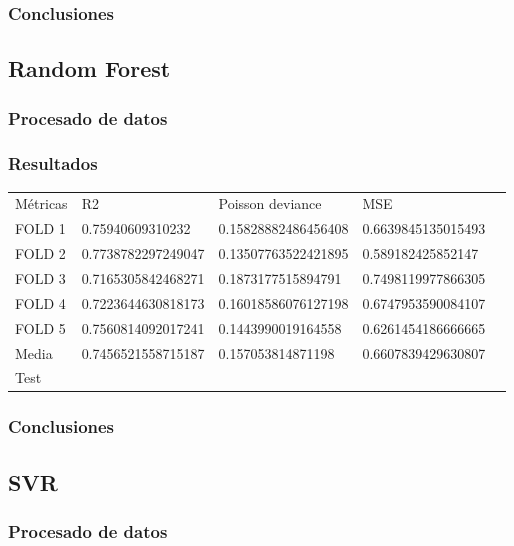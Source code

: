 \subsubsection{Conclusiones}

\subsection{Random Forest}
\subsubsection{Procesado de datos}
\subsubsection{Resultados}
\begin{table}[htbp]
    \begin{tabular}{|l|l|l|l|l}
    \cline{1-4}
    Métricas & R2                 & Poisson deviance    & MSE                \\ \cline{1-4}
    FOLD 1   & 0.75940609310232   & 0.15828882486456408 & 0.6639845135015493 \\ \cline{1-4}
    FOLD 2   & 0.7738782297249047 & 0.13507763522421895 & 0.589182425852147  \\ \cline{1-4}
    FOLD 3   & 0.7165305842468271 & 0.1873177515894791  & 0.7498119977866305 \\ \cline{1-4}
    FOLD 4   & 0.7223644630818173 & 0.16018586076127198 & 0.6747953590084107 \\ \cline{1-4}
    FOLD 5   & 0.7560814092017241 & 0.1443990019164558  & 0.6261454186666665 \\ \cline{1-4}
    Media    & 0.7456521558715187 & 0.157053814871198   & 0.6607839429630807 \\ \cline{1-4}
    Test & & & \\ \cline{1-4}
    \end{tabular}
\end{table}
\subsubsection{Conclusiones}
\pagebreak

\subsection{SVR}
\subsubsection{Procesado de datos}

